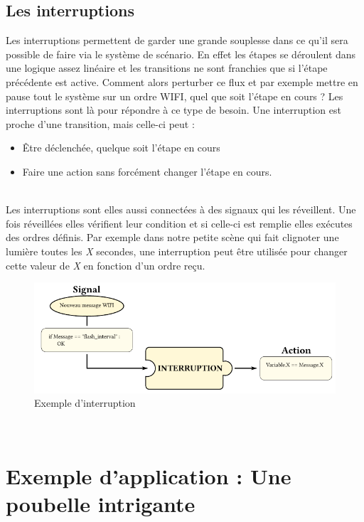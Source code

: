 \subsection{Les interruptions}
Les interruptions permettent de garder une grande souplesse dans ce qu'il sera possible de faire via le système de scénario. En effet les étapes se déroulent dans une logique assez linéaire et les transitions ne sont franchies que si l'étape précédente est active. Comment alors perturber ce flux et par exemple mettre en pause tout le système sur un ordre WIFI, quel que soit l'étape en cours ?\p
Les interruptions sont là pour répondre à ce type de besoin. Une interruption est proche d'une transition, mais celle-ci peut :
\begin{itemize}
\item Être déclenchée, quelque soit l'étape en cours
\item Faire une action sans forcément changer l'étape en cours.
\end{itemize}~\\
Les interruptions sont elles aussi connectées à des signaux qui les réveillent. Une fois réveillées elles vérifient leur condition et si celle-ci est remplie elles exécutes des ordres définis.\p
Par exemple dans notre petite scène qui fait clignoter une lumière toutes les \textit{X} secondes, une interruption peut être utilisée pour changer cette valeur de \textit{X} en fonction d'un ordre reçu.
\begin{figure}[htbp]
  \centering
  \includegraphics[width=.95\textwidth]{figs/interruption.pdf}
  \caption{Exemple d'interruption}
  \label{fig:interruption}
\end{figure} ~\\

\section{Exemple d'application : Une poubelle intrigante}

